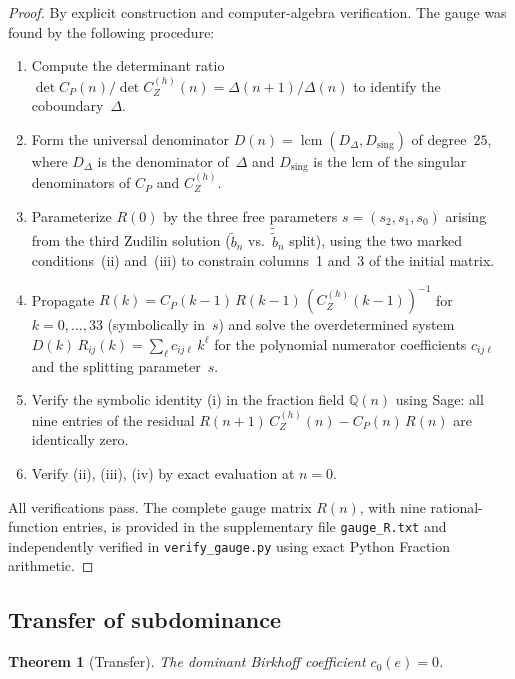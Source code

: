 \documentclass[11pt]{article}
\newtheorem{theorem}{Theorem}
\theoremstyle{remark}
\begin{document}
\begin{proof}
By explicit construction and computer-algebra verification.
The gauge was found by the following procedure:
\begin{enumerate}
\item Compute the determinant ratio
$\det C_P(n) / \det C_Z^{(h)}(n) = \Delta(n+1)/\Delta(n)$
to identify the coboundary~$\Delta$.
\item Form the universal denominator
$D(n) = \operatorname{lcm}(D_\Delta, D_{\mathrm{sing}})$
of degree~$25$, where $D_\Delta$ is the denominator of~$\Delta$
and $D_{\mathrm{sing}}$ is the lcm of the singular denominators
of $C_P$ and $C_Z^{(h)}$.
\item Parameterize $R(0)$ by the three free parameters
$s = (s_2, s_1, s_0)$ arising from the third Zudilin solution
($\tilde{b}_n$ vs.\ $\tilde{\tilde{b}}_n$ split), using the
two marked conditions~(ii) and~(iii) to constrain columns~1
and~3 of the initial matrix.
\item Propagate $R(k) = C_P(k{-}1)\,R(k{-}1)\,(C_Z^{(h)}(k{-}1))^{-1}$
for $k = 0, \ldots, 33$ (symbolically in~$s$) and solve
the overdetermined system
$D(k)\,R_{ij}(k) = \sum_\ell c_{ij\ell}\,k^\ell$
for the polynomial numerator coefficients $c_{ij\ell}$
and the splitting parameter~$s$.
\item Verify the symbolic identity (i) in the fraction field
$\mathbb{Q}(n)$ using Sage: all nine entries of the residual
$R(n{+}1)\,C_Z^{(h)}(n) - C_P(n)\,R(n)$ are identically zero.
\item Verify (ii), (iii), (iv) by exact evaluation at $n = 0$.
\end{enumerate}
All verifications pass. The complete gauge matrix $R(n)$, with
nine rational-function entries, is provided in the supplementary
file \texttt{gauge\_R.txt} and independently verified in
\texttt{verify\_gauge.py} using exact Python Fraction arithmetic.
\end{proof}

\subsection{Transfer of subdominance}\label{ssec:transfer}

\begin{theorem}[Transfer]\label{thm:transfer}
The dominant Birkhoff coefficient $c_0(e) = 0$.
\end{theorem}
\end{document}

